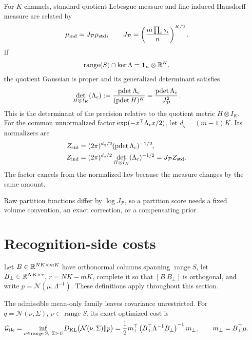 For \(K\) channels, standard quotient Lebesgue measure and fine-induced
Hausdorff measure are related by
\begin{equation}
\mu_{\rm ind}=J_{\mathcal P}\mu_{\rm std},\qquad
J_{\mathcal P}
=\left(\frac{m\prod_i s_i}{n}\right)^{K/2}.
\label{eq:cg-quotient-jacobian}
\end{equation}
If
\[
\operatorname{range}(S)\cap\ker\Lambda
=\mathbf1_n\otimes\mathbb R^K,
\]
the quotient Gaussian is proper and its generalized determinant satisfies
\begin{equation}
\det_{H\otimes I_K}(\Lambda_{\rm c})
:=\frac{\operatorname{pdet}\Lambda_{\rm c}}
{(\operatorname{pdet}H)^K}
=\frac{\operatorname{pdet}\Lambda_{\rm c}}{J_{\mathcal P}^2}.
\label{eq:cg-quotient-generalized-determinant}
\end{equation}
This is the determinant of the precision relative to the quotient metric
\(H\otimes I_K\). For the common unnormalized factor
\(\exp(-x^\top\Lambda_{\rm c}x/2)\), let \(d_q=(m-1)K\). Its normalizers are
\begin{equation}
\begin{aligned}
Z_{\rm std}
&=(2\pi)^{d_q/2}
(\operatorname{pdet}\Lambda_{\rm c})^{-1/2},\\
Z_{\rm ind}
&=(2\pi)^{d_q/2}
\det_{H\otimes I_K}(\Lambda_{\rm c})^{-1/2}
=J_{\mathcal P}Z_{\rm std}.
\end{aligned}
\label{eq:cg-quotient-normalizers}
\end{equation}
The factor cancels from the normalized law because the measure changes by
the same amount. 

Raw partition functions differ by \(\log J_{\mathcal P}\), so a partition
score needs a fixed volume convention, an exact correction, or a compensating
prior. 

\section{Recognition-side costs}
\label{sec:cg-restriction-costs}

Let \(B\in\mathbb R^{NK\times mK}\) have orthonormal columns spanning
\(\operatorname{range}S\), let
\(B_\perp\in\mathbb R^{NK\times r}\), \(r=NK-mK\), complete it so that
\([B\ B_\perp]\) is orthogonal, and write
\(p=\mathcal N(\mu,\Lambda^{-1})\). These definitions apply throughout this
section.

The admissible mean-only family leaves covariance unrestricted. For
\(q=\mathcal N(\nu,\Sigma)\), \(\nu\in\operatorname{range}S\), its exact
optimized cost is
\begin{equation}
\mathcal G_{\rm tie}
=\inf_{\nu\in\operatorname{range}S,\ \Sigma\succ0}
D_{\mathrm{KL}}\bigl(\mathcal N(\nu,\Sigma)\Vert p\bigr)
=\frac12m_\perp^\top
\left(B_\perp^\top\Lambda^{-1}B_\perp\right)^{-1}m_\perp,
\qquad
m_\perp=B_\perp^\top\mu.
\label{eq:cg-mean-tie-cost}
\end{equation}

